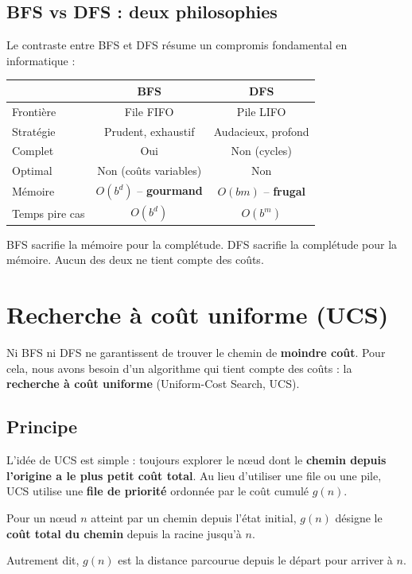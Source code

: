 \documentclass[11pt,a4paper]{article}
\begin{document}
\subsection{BFS vs DFS : deux philosophies}

Le contraste entre BFS et DFS résume un compromis fondamental en informatique :

\begin{center}
\begin{tabular}{lcc}
\toprule
& \textbf{BFS} & \textbf{DFS} \\
\midrule
Frontière & File FIFO & Pile LIFO \\
Stratégie & Prudent, exhaustif & Audacieux, profond \\
Complet & Oui & Non (cycles) \\
Optimal & Non (coûts variables) & Non \\
Mémoire & $O(b^d)$ -- \textbf{gourmand} & $O(bm)$ -- \textbf{frugal} \\
Temps pire cas & $O(b^d)$ & $O(b^m)$ \\
\bottomrule
\end{tabular}
\end{center}

BFS sacrifie la mémoire pour la complétude. DFS sacrifie la complétude pour la mémoire. Aucun des deux ne tient compte des coûts.

\section{Recherche à coût uniforme (UCS)}

Ni BFS ni DFS ne garantissent de trouver le chemin de \textbf{moindre coût}. Pour cela, nous avons besoin d'un algorithme qui tient compte des coûts : la \textbf{recherche à coût uniforme} (Uniform-Cost Search, UCS).

\subsection{Principe}

L'idée de UCS est simple : toujours explorer le nœud dont le \textbf{chemin depuis l'origine a le plus petit coût total}. Au lieu d'utiliser une file ou une pile, UCS utilise une \textbf{file de priorité} ordonnée par le coût cumulé $g(n)$.

\begin{definitionbox}
Pour un nœud $n$ atteint par un chemin depuis l'état initial, $g(n)$ désigne le \textbf{coût total du chemin} depuis la racine jusqu'à $n$.

Autrement dit, $g(n)$ est la distance parcourue depuis le départ pour arriver à $n$.
\end{definitionbox}
\end{document}
